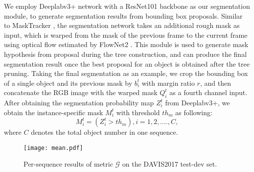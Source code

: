 \documentclass[10pt,twocolumn,letterpaper]{article}
\begin{document}
We employ Deeplabv3+ \cite{chen2018encoder} network with a ResNet101 \cite{He2015Deep} backbone as our segmentation module, to generate segmentation results from bounding box proposals. 
Similar to MaskTracker \cite{perazzi2017learning}, the segmentation network takes an additional rough mask as input, which is warped from the mask of the previous frame to the current frame using optical flow estimated by FlowNet2 \cite{ilg2017flownet}. 
This module is used to generate mask hypothesis from proposal during the tree construction, and can produce the final segmentation result once the best proposal for an object is obtained after the tree pruning. 
Taking the final segmentation as an example, we crop the bounding box of a single object and its previous mask by ${b^{{t}}_i}$ with margin ratio $r$, and then concatenate the RGB image with the warped mask $Q^{t}_i$ as a fourth channel input. 
After obtaining the segmentation probability map $Z^{t}_i$ from  Deeplabv3+, we obtain the instance-specific mask $M^{t}_i$ with threshold $th_{m}$ as following:
\begin{equation}
M^{t}_i = (Z^{t}_i > th_{m}), i = 1, 2, ...., C,
\end{equation}
where $C$ denotes the total object number in one sequence.

\begin{figure*}[t]
\vspace{-16pt}
\centering
\texttt{[image: mean.pdf]}
\vspace{-26pt}
\caption{Per-sequence results of metric $\mathcal{G}$ on the DAVIS2017 test-dev set.} 
\vspace{-4pt}
\label{fig:mean}
\end{figure*}
\end{document}
